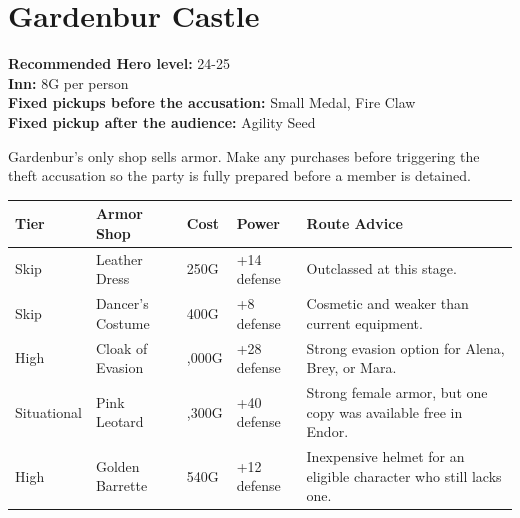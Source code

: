 \documentclass[
  american,
  10pt,
  letterpaper,
  oneside,
  open=any]{scrreprt}
\newcounter{none} %
\newenvironment{guidetable}{%
  \small\setstretch{1.0}%
  \setlength{\tabcolsep}{4pt}%
  \setlength{\LTpre}{8pt}\setlength{\LTpost}{10pt}%
  \renewcommand{\arraystretch}{1.16}%
}{ }
\begin{document}
\section{Gardenbur Castle}\label{gardenbur-castle}

\textbf{Recommended Hero level:} 24-25\\
\textbf{Inn:} 8G per person\\
\textbf{Fixed pickups before the accusation:} Small Medal, Fire Claw\\
\textbf{Fixed pickup after the audience:} Agility Seed

Gardenbur's only shop sells armor. Make any purchases before triggering
the theft accusation so the party is fully prepared before a member is
detained.

\begin{guidetable}

{\def\LTcaptype{none} %
\begin{longtable}[]{@{}
  >{\raggedright\arraybackslash}p{}
  >{\raggedright\arraybackslash}p{}
  >{\raggedleft\arraybackslash}p{}
  >{\raggedleft\arraybackslash}p{}
  >{\raggedright\arraybackslash}p{}@{}}
\toprule\noalign{}
\begin{minipage}[b]{\linewidth}\raggedright
\color{GuideGreen}\bfseries Tier
\end{minipage} & \begin{minipage}[b]{\linewidth}\raggedright
\color{GuideGreen}\bfseries Armor Shop
\end{minipage} & \begin{minipage}[b]{\linewidth}\raggedleft
\color{GuideGreen}\bfseries Cost
\end{minipage} & \begin{minipage}[b]{\linewidth}\raggedleft
\color{GuideGreen}\bfseries Power
\end{minipage} & \begin{minipage}[b]{\linewidth}\raggedright
\color{GuideGreen}\bfseries Route Advice
\end{minipage} \\
\midrule\noalign{}
\endhead
\bottomrule\noalign{}
\endlastfoot
Skip & Leather Dress & 250G & +14 defense & Outclassed at this stage. \\
Skip & Dancer's Costume & 400G & +8 defense & Cosmetic and weaker than
current equipment. \\
High & Cloak of Evasion & 3,000G & +28 defense & Strong evasion option
for Alena, Brey, or Mara. \\
Situational & Pink Leotard & 6,300G & +40 defense & Strong female armor,
but one copy was available free in Endor. \\
High & Golden Barrette & 540G & +12 defense & Inexpensive helmet for an
eligible character who still lacks one. \\
\end{longtable}
}

\end{guidetable}
\end{document}
